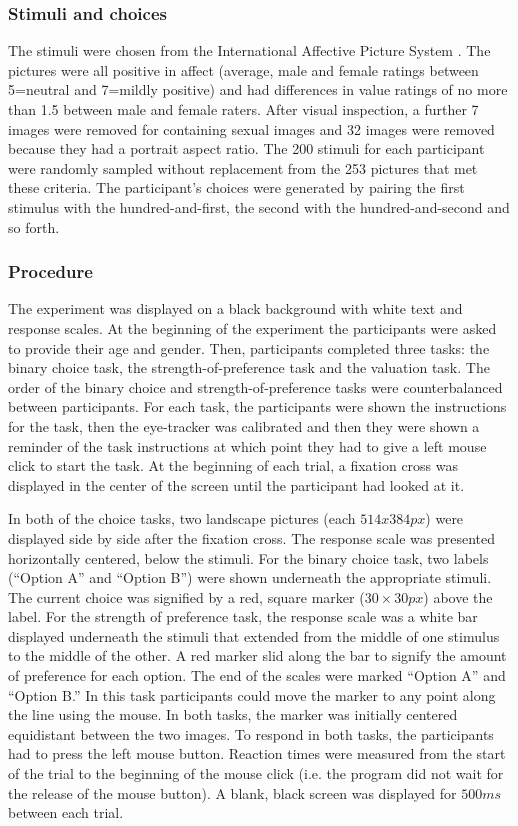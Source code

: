 \documentclass[doc, a4paper, apacite]{apa6}
\begin{document}
\subsubsection{Stimuli and choices}
The stimuli were chosen from the International Affective Picture System \cite{Lang:2008}. The pictures were all positive in affect (average, male and female ratings between 5=neutral and 7=mildly positive) and had differences in value ratings of no more than 1.5 between male and female raters. After visual inspection, a further 7 images were removed for containing sexual images and 32 images were removed because they had a portrait aspect ratio. The 200 stimuli for each participant were randomly sampled without replacement from the 253 pictures that met these criteria. The participant's choices were generated by pairing the first stimulus with the hundred-and-first, the second with the hundred-and-second and so forth. 

\subsubsection{Procedure}
The experiment was displayed on a black background with white text and response scales. At the beginning of the experiment the participants were asked to provide their age and gender. Then, participants completed three tasks: the binary choice task, the strength-of-preference task and the valuation task. The order of the binary choice and strength-of-preference tasks were counterbalanced between participants. For each task, the participants were shown the instructions for the task, then the eye-tracker was calibrated and then they were shown a reminder of the task instructions at which point they had to give a left mouse click to start the task. At the beginning of each trial, a fixation cross was displayed in the center of the screen until the participant had looked at it. 

In both of the choice tasks, two landscape pictures (each $514 x 384px$) were displayed side by side after the fixation cross. The response scale was presented horizontally centered, below the stimuli. For the binary choice task, two labels (``Option A'' and ``Option B'') were shown underneath the appropriate stimuli. The current choice was signified by a red, square marker ($30 \times 30px$) above the label. For the strength of preference task, the response scale was a white bar displayed underneath the stimuli that extended from the middle of one stimulus to the middle of the other. A red marker slid along the bar to signify the amount of preference for each option. The end of the scales were marked ``Option A'' and ``Option B.'' In this task participants could move the marker to any point along the line using the mouse. In both tasks, the marker was initially centered equidistant between the two images. To respond in both tasks, the participants had to press the left mouse button. Reaction times were measured from the start of the trial to the beginning of the mouse click (i.e. the program did not wait for the release of the mouse button). A blank, black screen was displayed for $500ms$ between each trial.
\end{document}
